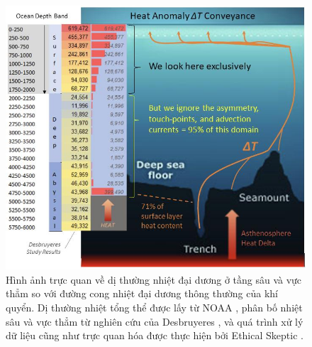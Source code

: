 \documentclass[10pt,twocolumn,letterpaper]{article}
\begin{document}
\begin{figure}[t]
\begin{center}
\includegraphics[width=1\textwidth]{deepsea.jpg}
\end{center}
   \caption{Hình ảnh trực quan về dị thường nhiệt đại dương ở tầng sâu và vực thẳm so với đường cong nhiệt đại dương thông thường của khí quyển. Dị thường nhiệt tổng thể được lấy từ NOAA \cite{147}, phân bố nhiệt sâu và vực thẳm từ nghiên cứu của Desbruyeres \cite{132}, và quá trình xử lý dữ liệu cũng như trực quan hóa được thực hiện bởi Ethical Skeptic \cite{129}.}
\label{fig:21}
\end{figure}
\end{document}
